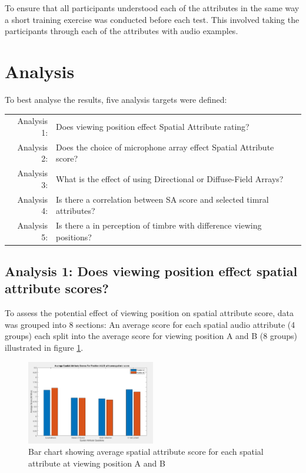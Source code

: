 \documentclass{aes2e}
\begin{document}
		To ensure that all participants understood each of the attributes in the same way a short training exercise was conducted before each test. This involved taking the participants through each of the attributes with audio examples. 


\section{Analysis}
	To best analyse the results, five analysis targets were defined:

	\begin{tabular}{r p{5.5cm}}
		Analysis 1: & Does viewing position effect Spatial Attribute rating? \\
		Analysis 2: & Does the choice of microphone array effect Spatial Attribute score? \\
		Analysis 3: & What is the effect of using Directional or Diffuse-Field Arrays? \\ 
		Analysis 4: & Is there a correlation between SA score and selected timral attributes? \\
		Analysis 5: & Is there a in perception of timbre with difference viewing positions?
	\end{tabular}

	\subsection{Analysis 1: Does viewing position effect spatial attribute scores?}

		To assess the potential effect of viewing position on spatial attribute score, data was grouped into 8 sections: An average score for each spatial audio attribute (4 groups) each split into the average score for viewing position A and B (8 groups) illustrated in figure \ref{image:AvsB}.

		\begin{figure}
			\includegraphics[width=0.5\textwidth]{AvB_Bar.PNG}
			\caption{Bar chart showing average spatial attribute score for each spatial attribute at viewing position A and B}
			\label{image:AvsB} 
		\end{figure}
\end{document}

